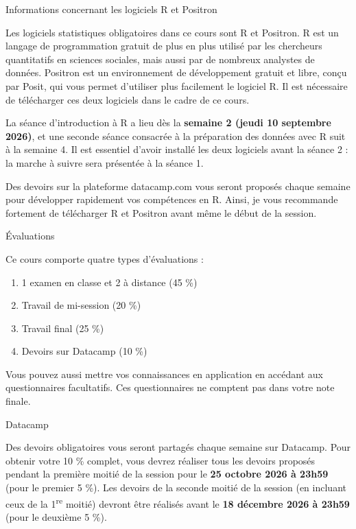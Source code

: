 \documentclass[10pt]{article}
\newcommand{\ulsub}[1]{%
  \needspace{3\baselineskip}%
  \vspace{10pt}%
  {\headfont\fontsize{12.5}{15}\selectfont #1}\par
  \vspace{2pt}%
}
\begin{document}
\ulsub{Informations concernant les logiciels R et Positron}
{\fontsize{9.5}{12.5}\selectfont
Les logiciels statistiques obligatoires dans ce cours sont R et Positron. R est un langage de programmation gratuit de plus en plus utilisé par les chercheurs quantitatifs en sciences sociales, mais aussi par de nombreux analystes de données. Positron est un environnement de développement gratuit et libre, conçu par Posit, qui vous permet d'utiliser plus facilement le logiciel R. Il est nécessaire de télécharger ces deux logiciels dans le cadre de ce cours.\par
\vspace{6pt}
La séance d'introduction à R a lieu dès la \textbf{semaine 2 (jeudi 10 septembre 2026)}, et une seconde séance consacrée à la préparation des données avec R suit à la semaine 4. Il est essentiel d'avoir installé les deux logiciels avant la séance 2 : la marche à suivre sera présentée à la séance 1.\par
\vspace{6pt}
Des devoirs sur la plateforme datacamp.com vous seront proposés chaque semaine pour développer rapidement vos compétences en R. Ainsi, je vous recommande fortement de télécharger R et Positron avant même le début de la session.\par
\par}

\ulsub{Évaluations}
{\fontsize{9.5}{12.5}\selectfont
Ce cours comporte quatre types d'évaluations :
\begin{enumerate}
  \item 1 examen en classe et 2 à distance (45 \%)
  \item Travail de mi-session (20 \%)
  \item Travail final (25 \%)
  \item Devoirs sur Datacamp (10 \%)
\end{enumerate}
Vous pouvez aussi mettre vos connaissances en application en accédant aux questionnaires facultatifs. Ces questionnaires ne comptent pas dans votre note finale.\par}

\ulsub{Datacamp}
{\fontsize{9.5}{12.5}\selectfont
Des devoirs obligatoires vous seront partagés chaque semaine sur Datacamp. Pour obtenir votre 10 \% complet, vous devrez réaliser tous les devoirs proposés pendant la première moitié de la session pour le \textbf{25 octobre 2026 à 23h59} (pour le premier 5 \%). Les devoirs de la seconde moitié de la session (en incluant ceux de la 1\textsuperscript{re} moitié) devront être réalisés avant le \textbf{18 décembre 2026 à 23h59} (pour le deuxième 5 \%).\par}
\end{document}
